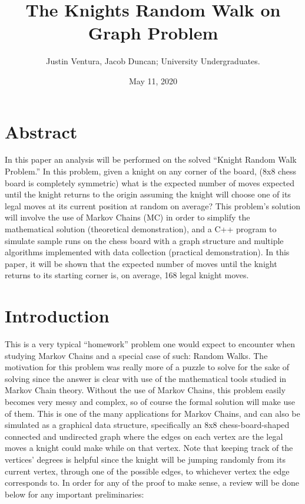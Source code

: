 \documentclass{article}
\title{The Knights Random Walk on Graph Problem}
\author{Justin Ventura, Jacob Duncan; University Undergraduates.}
\date{May 11, 2020}
\begin{document}
\maketitle

\section*{Abstract}
\indent \indent In this paper an analysis will be performed on the solved “Knight Random Walk Problem.”  In this problem, given a knight on any corner of the board, (8x8 chess board is completely symmetric) what is the expected number of moves expected until the knight returns to the origin assuming the knight will choose one of its legal moves at its current position at random on average?  This problem’s solution will involve the use of Markov Chains (MC) in order to simplify the mathematical solution (theoretical demonstration), and a C++ program to simulate sample runs on the chess board with a graph structure and multiple algorithms implemented with data collection (practical demonstration).  In this paper, it will be shown that the expected number of moves until the knight returns to its starting corner is, on average, 168 legal knight moves.

\section*{Introduction}
\indent \indent This is a very typical “homework” problem one would expect to encounter when studying Markov Chains and a special case of such: Random Walks.  The motivation for this problem was really more of a puzzle to solve for the sake of solving since the answer is clear with use of the mathematical tools studied in Markov Chain theory.  Without the use of Markov Chains, this problem easily becomes very messy and complex, so of course the formal solution will make use of them.  This is one of the many applications for Markov Chains, and can also be simulated as a graphical data structure, specifically an 8x8 chess-board-shaped connected and undirected graph where the edges on each vertex are the legal moves a knight could make while on that vertex.  Note that keeping track of the vertices’ degrees is helpful since the knight will be jumping randomly from its current vertex, through one of the possible edges, to whichever vertex the edge corresponds to.  In order for any of the proof to make sense, a review will be done below for any important preliminaries:
\end{document}
